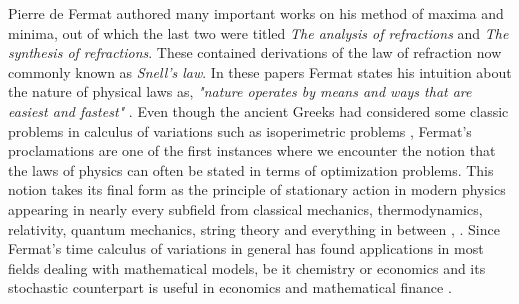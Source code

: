 Pierre de Fermat authored many important works on his method of maxima and minima, out of which the last two were titled \textit{The analysis of refractions} and \textit{The synthesis of refractions}. These contained derivations of the law of refraction now commonly known as \textit{Snell's law}. In these papers Fermat states his intuition about the nature of physical laws as, \textit{"nature operates by means and ways that are easiest and
fastest"} \cite{goldstine2012history}. Even though the ancient Greeks had considered some classic problems in calculus of variations such as  isoperimetric problems \cite{pappus1933pappus}, Fermat's proclamations are one of the first instances where we encounter the notion that the laws of physics can often be stated in terms of optimization problems. This notion takes its final form as the principle of stationary action in modern physics appearing in nearly every subfield from classical mechanics, thermodynamics, relativity, quantum mechanics, string theory and everything in between \cite{coopersmith2017lazy}, \cite{rojo2018principle}. Since Fermat's time calculus of variations in general has found applications in most fields dealing with mathematical models, be it chemistry \cite{quapp2008chemical} or economics \cite{guzowska2015calculus} and its stochastic counterpart is useful in economics \cite{oksendal1997introduction} and mathematical finance \cite{malliavin2006stochastic}. 

